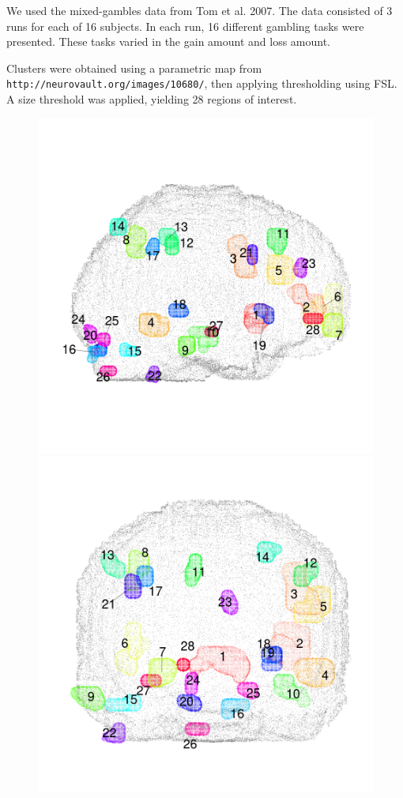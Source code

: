 \documentclass[12pt]{article}
\begin{document}
We used the mixed-gambles data from Tom et al. 2007.
The data consisted of 3 runs for each of 16 subjects.
In each run, 16 different gambling tasks were presented.
These tasks varied in the gain amount and loss amount.

Clusters were obtained using a parametric map from {\tt http://neurovault.org/images/10680/},
then applying thresholding using FSL.
A size threshold was applied, yielding 28 regions of interest.

\begin{figure}[h]
\centering
\includegraphics[scale = 0.12]{../a7plots/all_rois_view1.png}
\includegraphics[scale = 0.12]{../a7plots/all_rois_view2.png}

\end{figure}
\end{document}
